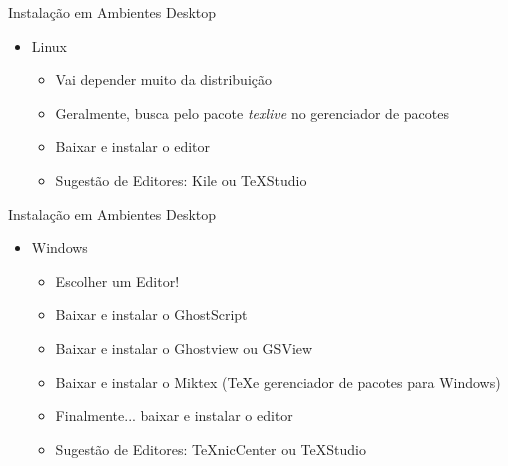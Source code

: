 \begin{frame}{Instalação em Ambientes Desktop}
    \begin{itemize}
    \item Linux
    \begin{itemize}
        \item Vai depender muito da distribuição
        \item Geralmente, busca pelo pacote \textit{texlive} no gerenciador de pacotes
        \item Baixar e instalar o editor
        \item Sugestão de Editores: Kile ou TeXStudio 
    \end{itemize}
    \end{itemize}
\end{frame}
\begin{frame}{Instalação em Ambientes Desktop}
    \begin{itemize}
        \item Windows
        \begin{itemize}
            \item Escolher um Editor!
            \item Baixar e instalar o GhostScript
            \item Baixar e instalar o Ghostview ou GSView
            \item Baixar e instalar o Miktex (\TeX e gerenciador de pacotes
            para Windows)
            \item Finalmente... baixar e instalar o editor
            \item Sugestão de Editores: TeXnicCenter ou TeXStudio            
        \end{itemize}
    \end{itemize}
\end{frame}
